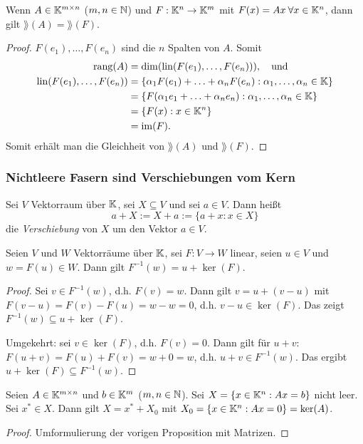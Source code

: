 \begin{bem}
	Wenn $ A\in\mathbb K^{m \times n} $ ($ m,n\in\mathbb N $) und $ F : \mathbb K^n \to \mathbb K^m $ mit $ F(x) = Ax \: \forall x\in\mathbb K^n $, dann gilt $ \rang(A) = \rang(F) $.
\end{bem}
\begin{proof}
	$ F(e_1),\ldots,F(e_n) $ sind die $ n $ Spalten von $ A $. Somit
	\begin{align*}
		\operatorname{rang}(A) &= \dim(\operatorname{lin}(F(e_1),\ldots,F(e_n))), \quad \text{und}\\
		\operatorname{lin}(F(e_1),\ldots,F(e_n)) &= \{ \alpha_1F(e_1) + \ldots + \alpha_nF(e_n) : \alpha_1,\ldots,\alpha_n\in\mathbb K \}\\
		&= \{ F(\alpha_1e_1 + \ldots + \alpha_ne_n) : \alpha_1,\ldots,\alpha_n\in\mathbb K \}\\
		&= \{ F(x) : x\in\mathbb K^n \}\\
		&= \operatorname{im}(F).
	\end{align*}
	Somit erhält man die Gleichheit von $ \rang(A) $ und $ \rang(F) $.
\end{proof}

\subsubsection{Nichtleere Fasern sind Verschiebungen vom Kern}

Sei $ V $ Vektorraum über $ \mathbb K $, sei $ X \subseteq V $ und sei $ a \in V $. Dann heißt
\begin{equation}
	a + X := X + a := \{ a+x : x \in X \}
\end{equation}
die \emph{Verschiebung} von $ X $ um den Vektor $ a \in V $.

\begin{propn}
	Seien $ V $ und $ W $ Vektorräume über $ \mathbb K $, sei $ F : V \to W $ linear, seien $ u \in V $ und $ w = F(u) \in W $. Dann gilt $ F^{-1}(w) = u + \ker(F) $.
\end{propn}
\begin{proof}
	Sei $ v \in F^{-1}(w) $, d.h. $ F(v) = w $. Dann gilt $ v = u + (v-u) $ mit $ F(v-u) = F(v)-F(u) = w-w = 0 $, d.h. $ v-u \in \ker(F) $. Das zeigt $ F^{-1}(w) \subseteq u + \ker(F) $.
	
	Umgekehrt: sei $ v \in \ker(F) $, d.h. $ F(v) = 0 $. Dann gilt für $ u+v $: $ F(u+v) = F(u) + F(v) = w+0 = w $, d.h. $ u+v \in F^{-1}(w) $. Das ergibt $ u + \ker(F) \subseteq F^{-1}(w) $.
\end{proof}

\begin{klr}
	Seien $ A\in\mathbb K^{m \times n} $ und $ b\in\mathbb K^m $ ($ m,n\in\mathbb N $). Sei $ X = \{ x\in\mathbb K^n : Ax = b \} $ nicht leer. Sei $ x^\ast \in X $. Dann gilt $ X = x^\ast + X_0 $ mit $ X_0 = \{ x\in\mathbb K^n : Ax = 0 \} = \ker(A) $.
\end{klr}
\begin{proof}
	Umformulierung der vorigen Proposition mit Matrizen.
\end{proof}

